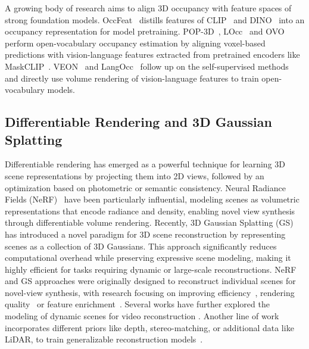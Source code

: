 A growing body of research aims to align 3D occupancy with feature spaces of strong foundation models.
OccFeat~\cite{sirko2024occfeat} distills features of CLIP~\cite{radford2021learning} and DINO~\cite{caron2021emerging, oquab2023dinov2} into an occupancy representation for model pretraining.
POP-3D~\cite{vobecky2024pop}, LOcc~\cite{yu2024language} and OVO~\cite{tan2023ovo} perform open-vocabulary occupancy estimation by aligning voxel-based predictions with vision-language features extracted from pretrained encoders like MaskCLIP~\cite{zhou2022extract}.
VEON~\cite{zheng2025veon} and LangOcc~\cite{boeder2024langocc} follow up on the self-supervised methods and directly use volume rendering of vision-language features to train open-vocabulary models.

\subsection{Differentiable Rendering and 3D Gaussian Splatting}
Differentiable rendering has emerged as a powerful technique for learning 3D scene representations by projecting them into 2D views, followed by an optimization based on photometric or semantic consistency.
Neural Radiance Fields (NeRF)~\cite{mildenhall2021nerf} have been particularly influential, modeling scenes as volumetric representations that encode radiance and density, enabling novel view synthesis through differentiable volume rendering.
Recently, 3D Gaussian Splatting (GS)~\cite{kerbl20233d} has introduced a novel paradigm for 3D scene reconstruction by representing scenes as a collection of 3D Gaussians.
This approach significantly reduces computational overhead while preserving expressive scene modeling, making it highly efficient for tasks requiring dynamic or large-scale reconstructions.
NeRF and GS approaches were originally designed to reconstruct individual scenes for novel-view synthesis, with research focusing on improving efficiency~\cite{muller2022instant, chen2025mvsplat}, rendering quality~\cite{barron2021mip, barron2022mip} or feature enrichment~\cite{qin2024langsplat, kerr2023lerf, ye2023featurenerf, zhou2024feature}.
Several works have further explored the modeling of dynamic scenes for video reconstruction \cite{wu20244d, fridovich2023k, pumarola2021d}.
Another line of work incorporates different priors like depth, stereo-matching, or additional data like LiDAR, to train generalizable reconstruction models~\cite{xu2022point,chang2022rc,chen2021mvsnerf,yu2021pixelnerf, wimbauer2023behind, liu2025mvsgaussian, zheng2024gps}.
